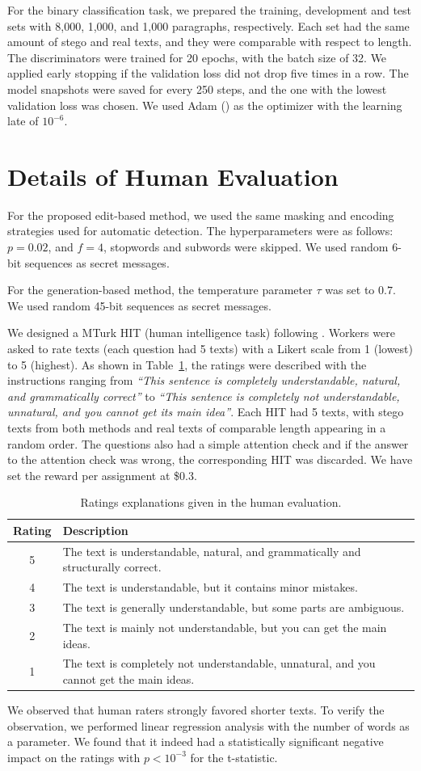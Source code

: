 \documentclass[11pt]{article}
\begin{document}
For the binary classification task, we prepared the training, development and test sets with 8,000, 1,000, and 1,000 paragraphs, respectively.
Each set had the same amount of stego and real texts, and they were comparable with respect to length.
The discriminators were trained for 20 epochs, with the batch size of 32.
We applied early stopping if the validation loss did not drop five times in a row.
The model snapshots were saved for every 250 steps, and the one with the lowest validation loss was chosen.
We used Adam (\citet{kingma2017adam}) as the optimizer with the learning late of $10^{-6}$.

\section{Details of Human Evaluation} \label{sec:a-human}

For the proposed edit-based method, we used the same masking and encoding strategies used for automatic detection.
The hyperparameters were as follows: $p = 0.02$, and $f = 4$, stopwords and subwords were skipped.
We used random 6-bit sequences as secret messages.

For the generation-based method, the temperature parameter $\tau$ was set to $0.7$.
We used random 45-bit sequences as secret messages.

We designed a MTurk HIT (human intelligence task) following \citet{abdelnabi2020adversarial}.
Workers were asked to rate texts (each question had 5 texts) with a Likert scale from 1 (lowest) to 5 (highest).
As shown in Table~\ref{tab:human-question}, the ratings were described with the instructions ranging from
\textit{``This sentence is completely understandable, natural, and grammatically correct''} to \textit{``This sentence is completely not understandable, unnatural, and you cannot get its main idea''}.
Each HIT had 5 texts, with stego texts from both methods and real texts of comparable length appearing in a random order.
The questions also had a simple attention check and if the answer to the attention check was wrong, the corresponding HIT was discarded.
We have set the reward per assignment at \$0.3.

\begin{table}[t]
    \centering
    \begin{tabular}{|c|p{5.7cm}|} \hline
        Rating & Description \\ \hline
        5 & The text is understandable, natural, and grammatically and structurally correct. \\
        4 & The text is understandable, but it contains minor mistakes. \\
        3 & The text is generally understandable, but some parts are ambiguous. \\
        2 & The text is mainly not understandable, but you can get the main ideas. \\
        1 & The text is completely not understandable, unnatural, and you cannot get the main ideas. \\ \hline
    \end{tabular}
    \caption{Ratings explanations given in the human evaluation.}
    \label{tab:human-question}
\end{table}

We observed that human raters strongly favored shorter texts.
To verify the observation, we performed linear regression analysis with the number of words as a parameter.
We found that it indeed had a statistically significant negative impact on the ratings with $p < 10^{-3}$ for the t-statistic.
\end{document}
